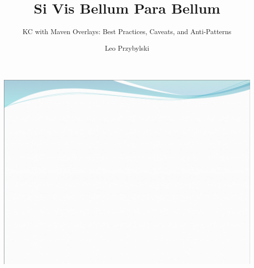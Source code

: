 \documentclass[xcolor=dvipsnames,14pt,professionalfonts]{beamer}
\begin{document}
\title{Si Vis Bellum Para Bellum}
\subtitle{KC with Maven Overlays: Best Practices, Caveats, and Anti-Patterns}
\author[Leo]{Leo Przybylski}

\usebackgroundtemplate%
{%
    \includegraphics[width=\paperwidth,height=\paperheight]{images/header.png}%
}

{
%
\begin{frame}[plain]
  \titlepage
\end{frame}
}
\end{document}
